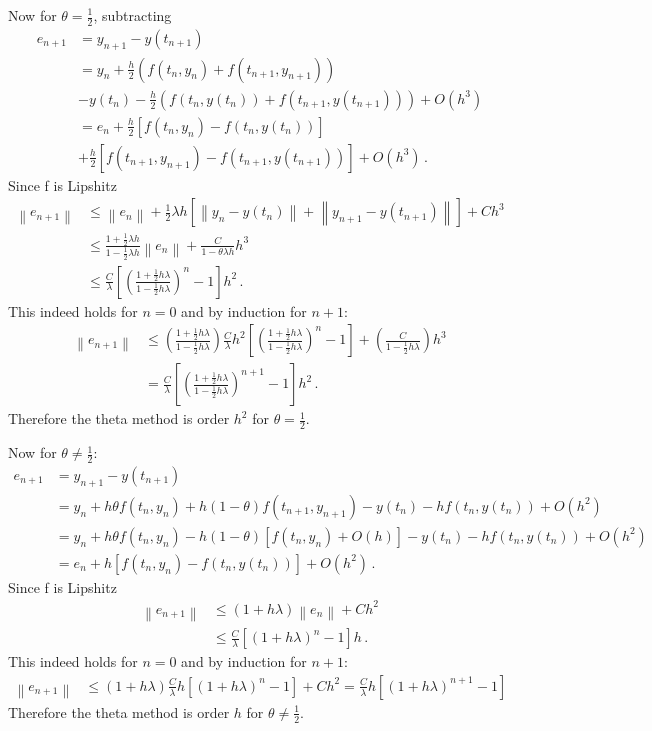 \documentclass[10pt,letterpaper]{article}
\providecommand{\norm}[1]{\left\lVert#1\right\rVert}
\begin{document}
Now for $\theta=\frac{1}{2}$, subtracting
\begin{align*}
e_{n+1}&=y_{n+1}-y(t_{n+1})\\
&=y_n+\frac{h}{2}(f(t_n,y_n)+f(t_{n+1},y_{n+1}))\\
&-y(t_n)-\frac{h}{2}(f(t_n,y(t_n))+f(t_{n+1},y(t_{n+1})))+O(h^3)\\
&=e_n+\frac{h}{2}[f(t_n,y_n)-f(t_n,y(t_n))]\\
&+\frac{h}{2}[f(t_{n+1},y_{n+1})-f(t_{n+1},y(t_{n+1}))]+O(h^3)\,.
\end{align*}
Since f is Lipshitz
\begin{align*}
\norm{e_{n+1}}&\leq\norm{e_n}+\frac{1}{2}\lambda h[\norm{y_n-y(t_n)}+\norm{y_{n+1}-y(t_{n+1})}]+Ch^3\\
&\leq\frac{1+\frac{1}{2}\lambda h}{1-\frac{1}{2}\lambda h}\norm{e_n}+\frac{C}{1-\theta\lambda h}h^3\\
&\leq\frac{C}{\lambda}\left[\left(\frac{1+\frac{1}{2}h\lambda}{1-\frac{1}{2}h\lambda}\right)^n-1\right]h^2\,.
\end{align*}
This indeed holds for $n=0$ and by induction for $n+1$:
\begin{align*}
\norm{e_{n+1}}&\leq\left(\frac{1+\frac{1}{2}h\lambda}{1-\frac{1}{2}h\lambda}\right)
\frac{C}{\lambda}h^2\left[\left(\frac{1+\frac{1}{2}h\lambda}{1-\frac{1}{2}h\lambda}\right)^n-1\right]
+\left(\frac{C}{1-\frac{1}{2}h\lambda}\right)h^3\\
&=\frac{C}{\lambda}\left[\left(\frac{1+\frac{1}{2}h\lambda}{1-\frac{1}{2}h\lambda}\right)^{n+1}-1\right]h^2\,.
\end{align*}
Therefore the theta method is order $h^2$ for $\theta=\frac{1}{2}$.

Now for $\theta\neq\frac{1}{2}$:
\begin{align*}
e_{n+1}&=y_{n+1}-y(t_{n+1})\\
&=y_n+h\theta f(t_n,y_n)+h(1-\theta)f(t_{n+1},y_{n+1})-y(t_n)-hf(t_n,y(t_n))+O(h^2)\\
&=y_n+h\theta f(t_n,y_n)-h(1-\theta)[f(t_n,y_n)+O(h)]-y(t_n)-hf(t_n,y(t_n))+O(h^2)\\
&=e_n+h[f(t_n,y_n)-f(t_n,y(t_n))]+O(h^2)\,.
\end{align*}
Since f is Lipshitz
\begin{align*}
\norm{e_{n+1}}&\leq(1+h\lambda)\norm{e_n}+Ch^2\\
&\leq\frac{C}{\lambda}\left[\left(1+h\lambda\right)^n-1\right]h\,.
\end{align*}
This indeed holds for $n=0$ and by induction for $n+1$:
\begin{align*}
\norm{e_{n+1}}&\leq(1+h\lambda)\frac{C}{\lambda}h[(1+h\lambda)^n-1]+Ch^2=\frac{C}{\lambda}h[(1+h\lambda)^{n+1}-1]
\end{align*}
Therefore the theta method is order $h$ for $\theta\neq\frac{1}{2}$.
\end{document}
